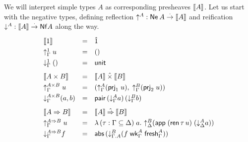 \documentclass[sigplan,screen]{acmart}
\begin{document}
We will interpret simple types $A$ as corresponding presheaves
$\mathopen{{[\kern-0.14em[}} A \mathclose{{]\kern-0.14em]}}$.  Let us start with the negative types, defining
reflection $\mathord{\uparrow_{}^{A}} : \mathsf{Ne}^{}\, A \stackrel{\cdot}{\to} \mathopen{{[\kern-0.14em[}} A \mathclose{{]\kern-0.14em]}}$
and reification $\mathord{\downarrow_{}^{A}} : \mathopen{{[\kern-0.14em[}} A \mathclose{{]\kern-0.14em]}} \stackrel{\cdot}{\to} \mathsf{Nf} A$ along the way.
\[
\def\arraystretch{1.3}
\begin{array}{lcl}
  \den   \tyone             & = & \hatone \\
  \upG   \tyone \; u        & = & \ttempty \\
  \downG \tyone \; \ttempty & = & \tunit \\[1ex]
  \den   {A \times B}       & = & \den A \hattimes \den B \\
  \upG   {A \times B} \; u  & = & (\upG A (\prj1 u),\;\upG B (\prj2 u)) \\
  \downG {A \times B} (a,b) & = & \tpair\,(\downG A a)\,(\downG B b) \\[1ex]
  \den {A \To B}    & = & \den A \hatto \den B \\
  \upG   {A \To B}\; u & = & \lambda \, (\tau : \Gamma \sublist \Delta) \; a %
     .\ \up[\Delta] B (\tapp\;(\tren\,\tau\, u)\;(\down[\Delta] A a)) \\
  \downG {A \To B}    f        & = & \tabs\,(\down[\cext \Gamma A] B
    (f\;\twk^A_\Gamma\;\tfresh^A_\Gamma))
\end{array}
\]
\end{document}

